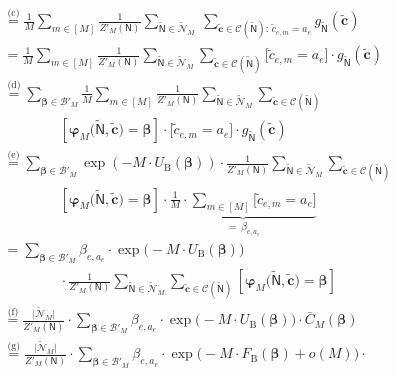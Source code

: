 \documentclass[journal, twocolumn]{IEEEtran}
\renewcommand{\mathbf}[1]{{\bm{#1}}}
\newcommand{\vect}[1]{\mathbf{#1}}
\newcommand{\code}[1]{\mathcal{#1}}
\newcommand{\set}[1]{\mathcal{#1}}
\newcommand{\graph}[1]{\mathsf{#1}}
\newcommand{\threestarseq}{\overset{\text{(c)}}{=}}
\newcommand{\fourstarseq}{\overset{\text{(d)}}{=}}
\newcommand{\fivestarseq}{\overset{\text{(e)}}{=}}
\newcommand{\sixstarseq}{\overset{\text{(f)}}{=}}
\newcommand{\sevenstarseq}{\overset{\text{(g)}}{=}}
\newcommand{\codeC}{\code{C}}
\newcommand{\bel}{\beta}
\newcommand{\vbel}{\boldsymbol{\bel}}
\newcommand{\cvc}{\vect{\cover{c}}}
\newcommand{\lmpBdown}[1]{\mathcal{B}'_{#1}}
\newcommand{\graphN}{\graph{N}}
\newcommand{\FBethe}{F_{\mathrm{B}}}
\newcommand{\UBethe}{U_{\mathrm{B}}}
\newcommand{\cover}[1]{\tilde{#1}}
\newcommand{\cset}[1]{\cover{\set{#1}}}
\newcommand{\cgraph}[1]{\cover{\graph{#1}}}
\newcommand{\cardbig}[1]{\big\lvert #1 \big\rvert}
\newcommand{\?}{\mathrm{?}}
\newcommand{\varphiM}{\boldsymbol{\varphi}_{M}}
\begin{document}
  \begin{align*}
    &\threestarseq
       \frac{1}{M}
       \sum_{m \in [M]}
         \frac{1}{Z'_M(\graphN)}
         \sum_{\cgraph{N} \in \cset{N}_M} \ 
           \sum_{\cvc \in \codeC(\cgraph{N}): \, \cover{c}_{e,m} = a_e}
             g_{\cgraph{N}}(\cvc) \\
    &= \frac{1}{M}
       \sum_{m \in [M]}
         \frac{1}{Z'_M(\graphN)}
         \sum_{\cgraph{N} \in \cset{N}_M}
           \sum_{\cvc \in \codeC(\cgraph{N})}
             \big[
               \cover{c}_{e,m} \! = \! a_e
             \big]
             \cdot
             g_{\cgraph{N}}(\cvc) \\
    &\fourstarseq
       \sum_{\vbel \in \lmpBdown{M}}
         \frac{1}{M}
         \sum_{m \in [M]}
           \frac{1}{Z'_M(\graphN)}
           \sum_{\cgraph{N} \in \cset{N}_M}
             \sum_{\cvc \in \codeC(\cgraph{N})} \\
    &\quad\quad\quad\quad
               \left[ \varphiM\big( \cgraph{N}, \cvc \big) = \vbel \right]
               \cdot
               \big[
                 \cover{c}_{e,m} \! = \! a_e
               \big]
               \cdot
               g_{\cgraph{N}}(\cvc) \\
    &\fivestarseq
       \sum_{\vbel \in \lmpBdown{M}}
         \exp(- M \cdot \UBethe(\vbel))
         \cdot
         \frac{1}{Z'_M(\graphN)}
         \sum_{\cgraph{N} \in \cset{N}_M}
           \sum_{\cvc \in \codeC(\cgraph{N})} \\
    &\quad\quad\quad\quad
             \left[ \varphiM\big( \cgraph{N}, \cvc \big) = \vbel \right]
             \cdot
             \underbrace{
               \frac{1}{M}
               \cdot
               \sum_{m \in [M]}
                 \big[
                   \cover{c}_{e,m} \! = \! a_e
                 \big]
             }_{= \ \bel_{e,a_e}} \\
    &= \sum_{\vbel \in \lmpBdown{M}}
         \bel_{e,a_e}
         \cdot
         \exp
           \big(
             - M \cdot \UBethe(\vbel)
           \big) \\
    &\quad\quad\quad\quad
         \cdot
         \frac{1}{Z'_M(\graphN)}
         \sum_{\cgraph{N} \in \cset{N}_M}
           \sum_{\cvc \in \codeC(\cgraph{N})}
             \left[ \varphiM\big( \cgraph{N}, \cvc \big) = \vbel \right]
              \\
    &\sixstarseq
       \frac{\cardbig{\cset{N}_M}}{Z'_M(\graphN)}
       \cdot
       \sum_{\vbel \in \lmpBdown{M}}
         \bel_{e,a_e}
         \cdot
         \exp
           \big(
             - M \cdot \UBethe(\vbel)
           \big)
         \cdot
         \bar C_M(\vbel) \\
    &\sevenstarseq
       \frac{\cardbig{\cset{N}_M}}{Z'_M(\graphN)}
       \cdot
       \sum_{\vbel \in \lmpBdown{M}}
         \bel_{e,a_e}
         \cdot
         \exp
           \big(
             - M \cdot \FBethe(\vbel) + o(M)
           \big)
         \cdot
\end{align*}
\end{document}
